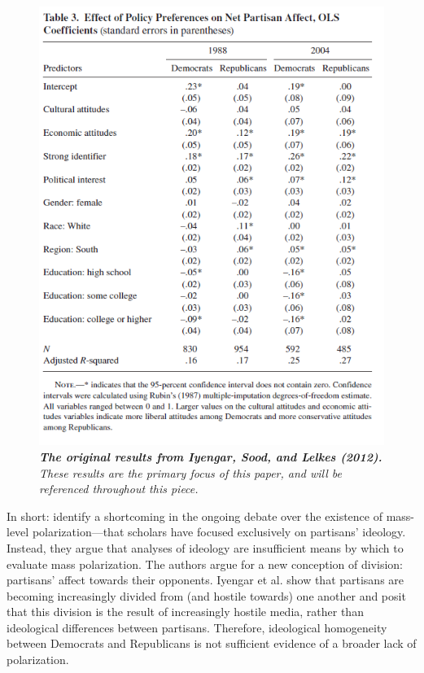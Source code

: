 \documentclass[12pt]{article}
\begin{document}
\begin{figure}[H]
\center\includegraphics[width=5in]{isl-fig-3.png}
\caption{\label{fig:cdf-avg}\textit{\textbf{The original results from Iyengar, Sood, and Lelkes (2012).} These results are the primary focus of this paper, and will be referenced throughout this piece.}}
\end{figure}

In short: \citeauthor{iyengar2012affect} identify a shortcoming in the ongoing debate over the existence of mass-level polarization---that scholars have focused exclusively on partisans' ideology. Instead, they argue that analyses of ideology are insufficient means by which to evaluate mass polarization. The authors argue for a new conception of division: partisans' affect towards their opponents. Iyengar et al. show that partisans are becoming increasingly divided from (and hostile towards) one another and posit that this division is the result of increasingly hostile media, rather than ideological differences between partisans. Therefore, ideological homogeneity between Democrats and Republicans is not sufficient evidence of a broader lack of polarization. 
\end{document}
